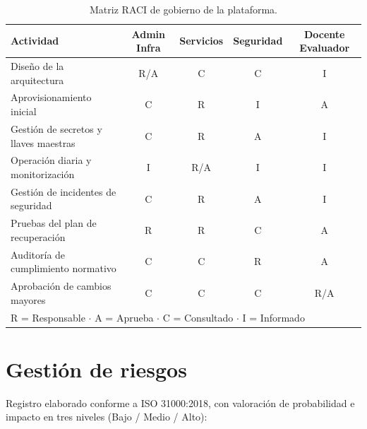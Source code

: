 \documentclass[10pt,a4paper]{article}
\begin{document}
\begin{table}[htbp]
\centering
\small
\caption{Matriz RACI de gobierno de la plataforma.}
\label{tab:raci}
\begin{tabular}{|p{6.5cm}|c|c|c|c|}
\hline
\textbf{\textsf{Actividad}} & \textbf{\textsf{Admin Infra}} & \textbf{\textsf{Servicios}} & \textbf{\textsf{Seguridad}} & \textbf{\textsf{Docente Evaluador}} \\
\hline
Diseño de la arquitectura & R/A & C & C & I \\
\hline
Aprovisionamiento inicial & C & R & I & A \\
\hline
Gestión de secretos y llaves maestras & C & R & A & I \\
\hline
Operación diaria y monitorización & I & R/A & I & I \\
\hline
Gestión de incidentes de seguridad & C & R & A & I \\
\hline
Pruebas del plan de recuperación & R & R & C & A \\
\hline
Auditoría de cumplimiento normativo & C & C & R & A \\
\hline
Aprobación de cambios mayores & C & C & C & R/A \\
\hline
\multicolumn{5}{|l|}{\footnotesize R = Responsable $\cdot$ A = Aprueba $\cdot$ C = Consultado $\cdot$ I = Informado} \\
\hline
\end{tabular}
\end{table}

\newpage
\section{Gestión de riesgos}
Registro elaborado conforme a ISO 31000:2018, con valoración de probabilidad e impacto en tres niveles (Bajo / Medio / Alto):
\end{document}
